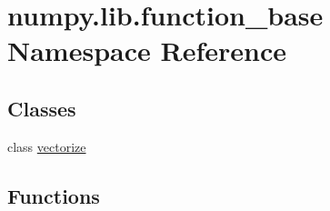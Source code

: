 \hypertarget{namespacenumpy_1_1lib_1_1function__base}{}\section{numpy.\+lib.\+function\+\_\+base Namespace Reference}
\label{namespacenumpy_1_1lib_1_1function__base}
\subsection*{Classes}
\begin{DoxyCompactItemize}
\item 
class \hyperlink{classnumpy_1_1lib_1_1function__base_1_1vectorize}{vectorize}
\end{DoxyCompactItemize}
\subsection*{Functions}
